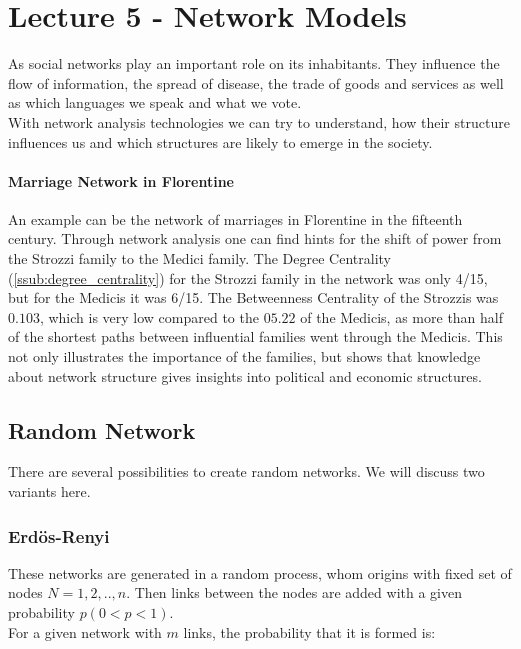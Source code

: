 \section{Lecture 5 - Network Models} %
\label{sec:lecture_5_network_models}
As social networks play an important role on its inhabitants.
They influence the flow of information,
the spread of disease,
the trade of goods and services as well as which languages we speak and what we vote.\\
With network analysis technologies we can try to understand,
how their structure influences us
and which structures are likely to emerge in the society.

\paragraph{Marriage Network in Florentine} %
\label{par:marriage_network_in_florentine}
	An example can be the network of marriages in Florentine in the fifteenth century.
	Through network analysis one can find hints for the shift of power from the 
	Strozzi family to the Medici family.
	The Degree Centrality (\ref{ssub:degree_centrality}) for the Strozzi family in the network
	was only 4/15, but for the Medicis it was 6/15.
	The Betweenness Centrality of the Strozzis was $0.103$,
	which is very low compared to the $05.22$ of the Medicis,
	as more than half of the shortest paths between influential families went through the Medicis.
	This not only illustrates the importance of the families,
	but shows that knowledge about network structure gives insights into political and economic structures.

\subsection{Random Network} %
\label{sub:random_network}
There are several possibilities to create random networks.
We will discuss two variants here.

\subsubsection{Erd\"os-Renyi\\} %
\label{ssub:erdoes-renyi}
These networks are generated in a random process,
whom origins with fixed set of nodes $N = {1,2,..,n}$.
Then links between the nodes are added with a given probability $p (0 < p < 1)$.\\
For a given network with $m$ links,
the probability that it is formed is:

